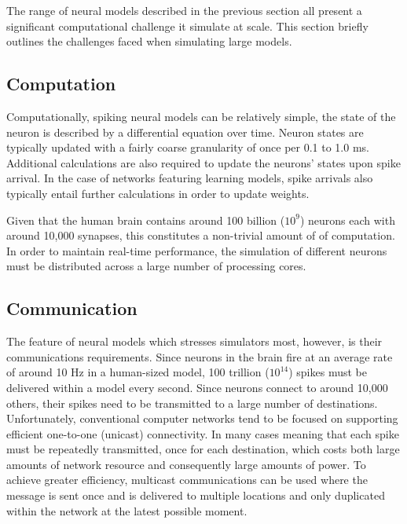 		The range of neural models described in the previous section all present a
		significant computational challenge it simulate at scale. This section
		briefly outlines the challenges faced when simulating large models.
		
		
		\subsection{Computation}
			
			Computationally, spiking neural models can be relatively simple, the state
			of the neuron is described by a differential equation over time. Neuron
			states are typically updated with a fairly coarse granularity of once per
			0.1 to 1.0 ms. Additional calculations are also required to update the
			neurons' states upon spike arrival. In the case of networks featuring
			learning models, spike arrivals also typically entail further calculations
			in order to update weights.
			
			Given that the human brain contains around 100 billion ($10^9$) neurons
			each with around 10,000 synapses, this constitutes a non-trivial amount of
			of computation. In order to maintain real-time performance, the simulation
			of different neurons must be distributed across a large number of
			processing cores.
		
		\subsection{Communication}
			
			
			
			The feature of neural models which stresses simulators most, however, is
			their communications requirements. Since neurons in the brain fire at an
			average rate of around 10 Hz in a human-sized model, 100 trillion
			($10^{14}$) spikes must be delivered within a model every second. Since
			neurons connect to around 10,000 others, their spikes need to be
			transmitted to a large number of destinations. Unfortunately, conventional
			computer networks tend to be focused on supporting efficient one-to-one
			(unicast) connectivity. In many cases meaning that each spike must be
			repeatedly transmitted, once for each destination, which costs both large
			amounts of network resource and consequently large amounts of power. To
			achieve greater efficiency, multicast communications can be used where the
			message is sent once and is delivered to multiple locations and only
			duplicated within the network at the latest possible moment.
			
